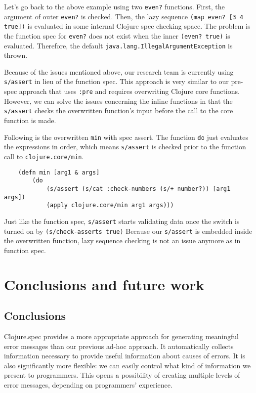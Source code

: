 \documentclass[12pt]{article}
\begin{document}
	Let's go back to the above example using two {\tt even?} functions. 
	First, the argument of outer {\tt even?} is checked. Then, the lazy sequence {\tt (map even? [3 4 true])} is
	evaluated in some internal Clojure spec checking space. The problem is the function spec for {\tt even?} does not exist
	when the inner {\tt (even? true)} is evaluated. Therefore, the default {\tt java.lang.IllegalArgumentException} is thrown.

	Because of the issues mentioned above, our research team is currently using {\tt s/assert} in lieu of the function spec.
	This approach is very similar to our pre-spec approach that uses {\tt :pre} and requires overwriting 
	Clojure core functions. However, we can solve the issues concerning the inline functions in that 
	the {\tt s/assert} checks the overwritten function's input before the call to the core function is made. 
	
	Following is the overwritten {\tt min} with spec assert. The function {\tt do} just evaluates
	the expressions in order, which means {\tt s/assert} is checked prior to the function call to {\tt clojure.core/min}.
	\begin{verbatim}
	(defn min [arg1 & args]
  		(do 
    		(s/assert (s/cat :check-numbers (s/+ number?)) [arg1 args])
    		(apply clojure.core/min arg1 args)))
	\end{verbatim} 
	Just like the function spec, {\tt s/assert} starts validating data once the switch is turned on by {\tt (s/check-asserts true)}
	Because our {\tt s/assert} is embedded inside the overwritten function, lazy sequence checking is not
	an issue anymore as in function spec.
	
	
\section{Conclusions and future work}\label{sec:conclusion}
	\subsection{Conclusions}
	Clojure.spec provides a more appropriate approach for generating meaningful error messages than our
	previous ad-hoc approach. It automatically collects information necessary to provide useful information 
	about causes of errors. It is also significantly more flexible: we can easily control what kind of information
	we present to programmers. This opens a possibility of creating multiple levels of error messages,
	depending on programmers' experience. 
\end{document}
